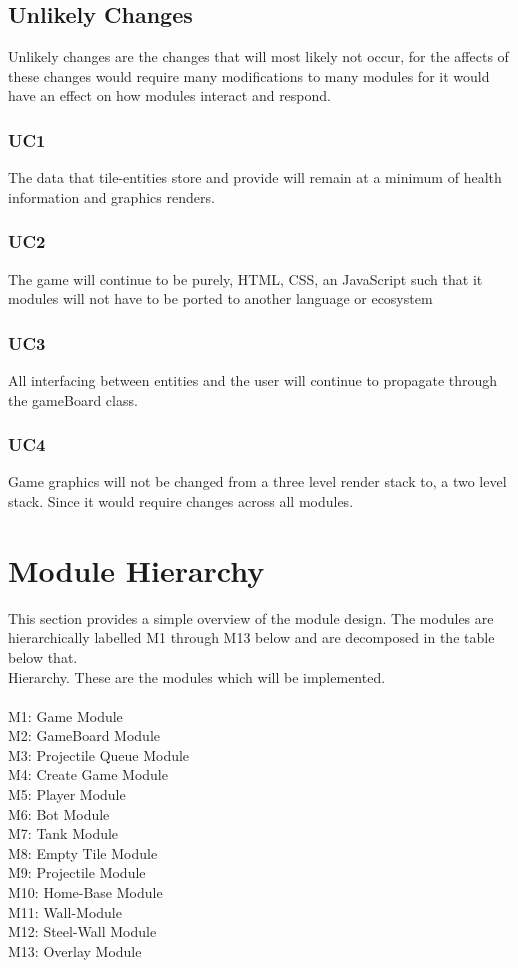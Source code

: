 \documentclass{article}
\begin{document}
\subsection{Unlikely Changes}
Unlikely changes are the changes that will most likely not occur, for the affects of these changes would require many modifications to many modules for it would have an effect on how modules interact and respond.
\subsubsection*{UC1}
The data that tile-entities store and provide will remain at a minimum of health information and graphics renders.
\subsubsection*{UC2}
The game will continue to be purely, HTML, CSS, an JavaScript such that it modules will not have to be ported to another language or ecosystem
\subsubsection*{UC3} 
All interfacing between entities and the user will continue to propagate through the gameBoard class.
\subsubsection*{UC4}
  Game graphics will not be changed from a three level render stack to, a two level stack. Since it would require changes across all modules.

\section{Module Hierarchy}
This section provides a simple overview of the module design. The modules are hierarchically labelled M1 through M13 below and are decomposed in the table below that. 
\\
Hierarchy. These are the modules which will be implemented.
\\ \\M1: Game Module
\\M2: GameBoard Module
\\M3: Projectile Queue Module
\\M4: Create Game Module
\\M5: Player Module
\\M6: Bot Module
\\M7: Tank Module
\\M8: Empty Tile Module
\\M9: Projectile Module
\\M10: Home-Base Module
\\M11: Wall-Module
\\M12: Steel-Wall Module
\\M13: Overlay Module
\end{document}
